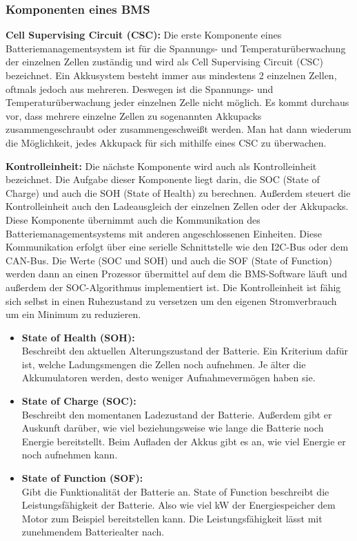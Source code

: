 \subsubsection{Komponenten eines BMS}

\textbf{Cell Supervising Circuit (CSC):}
Die erste Komponente eines Batteriemanagementsystem ist für die Spannungs- und Temperaturüberwachung der einzelnen Zellen zuständig und wird als Cell Supervising Circuit (CSC) bezeichnet. Ein Akkusystem besteht immer aus mindestens 2 einzelnen Zellen, oftmals jedoch aus mehreren. Deswegen ist die Spannungs- und Temperaturüberwachung jeder einzelnen Zelle nicht möglich. Es kommt  durchaus vor, dass mehrere einzelne Zellen zu sogenannten Akkupacks zusammengeschraubt oder zusammengeschweißt werden. Man hat dann wiederum die Möglichkeit, jedes Akkupack für sich mithilfe eines CSC zu überwachen.

\textbf{Kontrolleinheit:}
Die nächste Komponente wird auch als Kontrolleinheit bezeichnet. Die Aufgabe dieser Komponente liegt darin, die SOC (State of Charge) und auch die SOH (State of Health) zu berechnen. Außerdem steuert die Kontrolleinheit auch den Ladeausgleich der einzelnen Zellen oder der Akkupacks. Diese Komponente übernimmt auch die Kommunikation des Batteriemanagementsystems mit anderen angeschlossenen Einheiten. Diese Kommunikation erfolgt über eine serielle Schnittstelle wie den I2C-Bus oder dem CAN-Bus. Die Werte (SOC und SOH) und auch die SOF (State of Function) werden dann an einen Prozessor übermittel auf dem die BMS-Software läuft und außerdem der SOC-Algorithmus implementiert ist. Die Kontrolleinheit ist fähig sich selbst in einen Ruhezustand zu versetzen um den eigenen Stromverbrauch um ein Minimum zu reduzieren.

\begin{itemize}
	\item \textbf{State of Health (SOH):} \medskip\\
	Beschreibt den aktuellen Alterungszustand der Batterie. Ein Kriterium dafür ist, welche Ladungsmengen die Zellen noch aufnehmen. Je älter die Akkumulatoren werden, desto weniger Aufnahmevermögen haben sie.

\item \textbf{State of Charge (SOC):} \medskip\\
	Beschreibt den momentanen Ladezustand der Batterie. Außerdem gibt er Auskunft darüber, wie viel beziehungsweise wie lange die Batterie noch Energie bereitstellt. Beim Aufladen der Akkus gibt es an, wie viel Energie er noch aufnehmen kann.

\item \textbf{State of Function (SOF):} \medskip\\
	Gibt die Funktionalität der Batterie an. State of Function beschreibt die Leistungsfähigkeit der Batterie. Also wie viel kW der Energiespeicher dem Motor zum Beispiel bereitstellen kann. Die Leistungsfähigkeit lässt mit zunehmendem Batteriealter nach.
\end{itemize}

